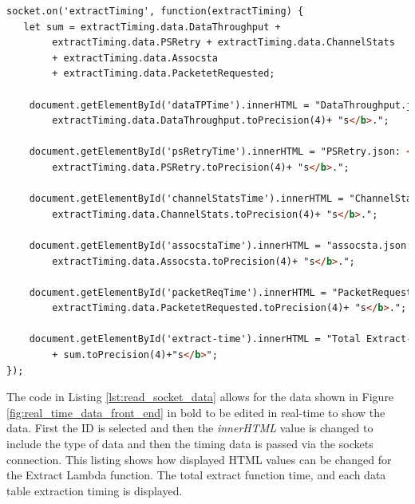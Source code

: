 \begin{lstlisting}[language=HTML, label={lst:read_socket_data}, caption={Reading data sent from the sockets.io connection from the server back-end and editing the front-end HTML page.}]
socket.on('extractTiming', function(extractTiming) {
   let sum = extractTiming.data.DataThroughput + 
        extractTiming.data.PSRetry + extractTiming.data.ChannelStats 
        + extractTiming.data.Assocsta
        + extractTiming.data.PacketetRequested;
        
    document.getElementById('dataTPTime').innerHTML = "DataThroughput.json: <b>" +
        extractTiming.data.DataThroughput.toPrecision(4)+ "s</b>.";
        
    document.getElementById('psRetryTime').innerHTML = "PSRetry.json: <b>" +
        extractTiming.data.PSRetry.toPrecision(4)+ "s</b>.";
        
    document.getElementById('channelStatsTime').innerHTML = "ChannelStats.json: <b>" +
        extractTiming.data.ChannelStats.toPrecision(4)+ "s</b>.";
        
    document.getElementById('assocstaTime').innerHTML = "assocsta.json: <b>" +
        extractTiming.data.Assocsta.toPrecision(4)+ "s</b>.";
        
    document.getElementById('packetReqTime').innerHTML = "PacketRequested.json: <b>" +
        extractTiming.data.PacketetRequested.toPrecision(4)+ "s</b>.";
        
    document.getElementById('extract-time').innerHTML = "Total Extract-Fn Time: <b>"
        + sum.toPrecision(4)+"s</b>";
});
\end{lstlisting}

The code in Listing \ref{lst:read_socket_data} allows for the data shown in Figure \ref{fig:real_time_data_front_end} in bold to be edited in real-time to show the data. First the ID is selected and then the \textit{innerHTML} value is changed to include the type of data and then the timing data is passed via the sockets connection. This listing shows how displayed HTML values can be changed for the Extract Lambda function. The total extract function time, and each data table extraction timing is displayed.


